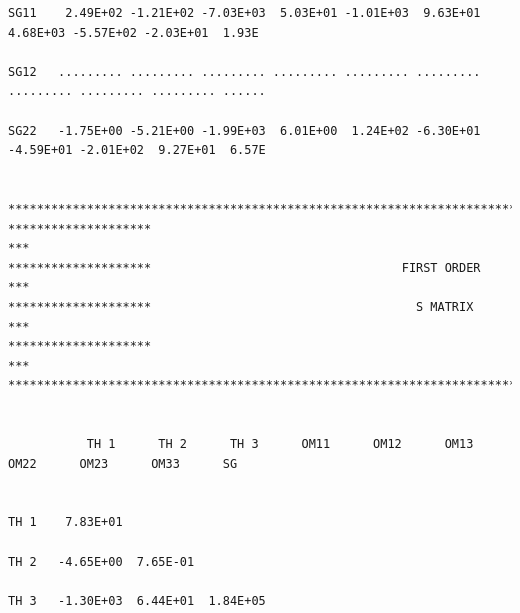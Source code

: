 \documentclass[
  10pt,
]{krantz}
\begin{document}
\begin{verbatim}
SG11    2.49E+02 -1.21E+02 -7.03E+03  5.03E+01 -1.01E+03  9.63E+01  4.68E+03 -5.57E+02 -2.03E+01  1.93E
                                                                                                       
SG12   ......... ......... ......... ......... ......... ......... ......... ......... ......... ......
                                                                                                       
SG22   -1.75E+00 -5.21E+00 -1.99E+03  6.01E+00  1.24E+02 -6.30E+01 -4.59E+01 -2.01E+02  9.27E+01  6.57E
                                                                                                       
                                                                                                       
*******************************************************************************************************
********************                                                                                ***
********************                                   FIRST ORDER                                  ***
********************                                     S MATRIX                                   ***
********************                                                                                ***
*******************************************************************************************************
                                                                                                       
                                                                                                       
           TH 1      TH 2      TH 3      OM11      OM12      OM13      OM22      OM23      OM33      SG
                                                                                                       
                                                                                                       
TH 1    7.83E+01                                                                                       
                                                                                                       
TH 2   -4.65E+00  7.65E-01                                                                             
                                                                                                       
TH 3   -1.30E+03  6.44E+01  1.84E+05                                                                   
                                                                                                       

\end{verbatim}
\end{document}
